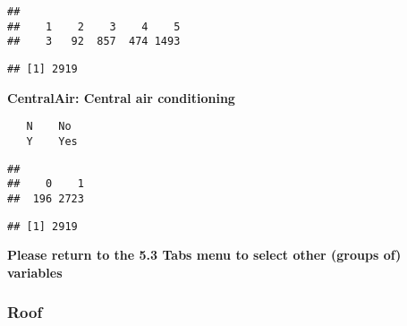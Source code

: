 \documentclass[]{article}
\newenvironment{Shaded}{\begin{snugshade}}{\end{snugshade}}
\newcommand{\KeywordTok}[1]{\textcolor[rgb]{0.13,0.29,0.53}{\textbf{#1}}}
\newcommand{\DecValTok}[1]{\textcolor[rgb]{0.00,0.00,0.81}{#1}}
\newcommand{\StringTok}[1]{\textcolor[rgb]{0.31,0.60,0.02}{#1}}
\newcommand{\OperatorTok}[1]{\textcolor[rgb]{0.81,0.36,0.00}{\textbf{#1}}}
\newcommand{\NormalTok}[1]{#1}
\begin{document}
\begin{verbatim}
## 
##    1    2    3    4    5 
##    3   92  857  474 1493
\end{verbatim}

\begin{Shaded}
\end{Shaded}

\begin{verbatim}
## [1] 2919
\end{verbatim}

\textbf{CentralAir: Central air conditioning}

\begin{verbatim}
   N    No
   Y    Yes
\end{verbatim}

\begin{Shaded}
\end{Shaded}

\begin{verbatim}
## 
##    0    1 
##  196 2723
\end{verbatim}

\begin{Shaded}
\end{Shaded}

\begin{verbatim}
## [1] 2919
\end{verbatim}

\textbf{Please return to the 5.3 Tabs menu to select other (groups of)
variables}

\subsubsection{Roof}\label{roof}
\end{document}
